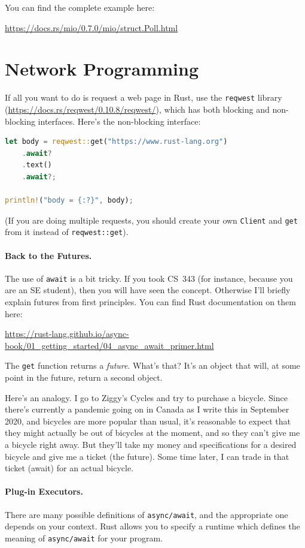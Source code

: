 \documentclass[a4paper]{report}
\begin{document}
You can find the complete example here:
\begin{center}
\url{https://docs.rs/mio/0.7.0/mio/struct.Poll.html}
\end{center}

\section*{Network Programming}
If all you want to do is request a web page in Rust, use
the \texttt{reqwest} library (\url{https://docs.rs/reqwest/0.10.8/reqwest/}),
which has both blocking and non-blocking interfaces. Here's the
non-blocking interface:
    \begin{lstlisting}[language=Rust]
let body = reqwest::get("https://www.rust-lang.org")
    .await?
    .text()
    .await?;

println!("body = {:?}", body);
\end{lstlisting}
(If you are doing multiple requests,
you should create your own \texttt{Client} and \texttt{get} from it instead of
\texttt{reqwest::get}).

\paragraph{Back to the Futures.}
The use of \texttt{await} is a bit tricky. If you took CS~343
(for instance, because you are an SE student), then you will have seen
the concept. Otherwise I'll briefly explain futures from first principles.
You can find Rust documentation on them here:
\begin{center}
\url{https://rust-lang.github.io/async-book/01_getting_started/04_async_await_primer.html}
\end{center}

The \texttt{get} function returns a \emph{future}. What's that?  It's
an object that will, at some point in the future, return a second
object.

Here's an analogy. I go to Ziggy's Cycles and try to purchase a
bicycle. Since there's currently a pandemic going on in Canada as I
write this in September 2020, and bicycles are more popular than
usual, it's reasonable to expect that they might actually be out of
bicycles at the moment, and so they can't
give me a bicycle right away.  But they'll take my money and
specifications for a desired bicycle and give me a ticket (the
future). Some time later, I can trade in that ticket (await) for an
actual bicycle.

\paragraph{Plug-in Executors.}
There are many possible definitions of \texttt{async/await}, and the appropriate
one depends on your context. Rust allows you to specify a runtime
which defines the meaning of \texttt{async/await} for your program.
\end{document}
